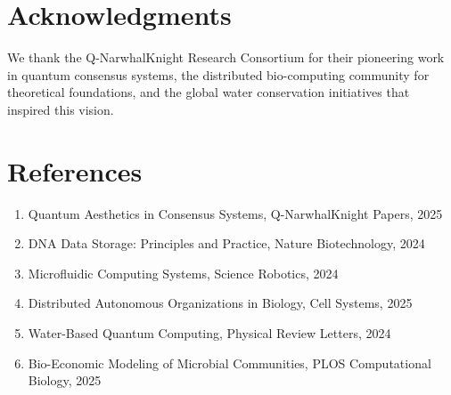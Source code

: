 \documentclass[11pt,a4paper]{article}
\begin{document}
\section*{Acknowledgments}

We thank the Q-NarwhalKnight Research Consortium for their pioneering work in quantum consensus systems, the distributed bio-computing community for theoretical foundations, and the global water conservation initiatives that inspired this vision.

\section*{References}

\begin{enumerate}
    \item Quantum Aesthetics in Consensus Systems, Q-NarwhalKnight Papers, 2025
    \item DNA Data Storage: Principles and Practice, Nature Biotechnology, 2024
    \item Microfluidic Computing Systems, Science Robotics, 2024
    \item Distributed Autonomous Organizations in Biology, Cell Systems, 2025
    \item Water-Based Quantum Computing, Physical Review Letters, 2024
    \item Bio-Economic Modeling of Microbial Communities, PLOS Computational Biology, 2025
\end{enumerate}
\end{document}
